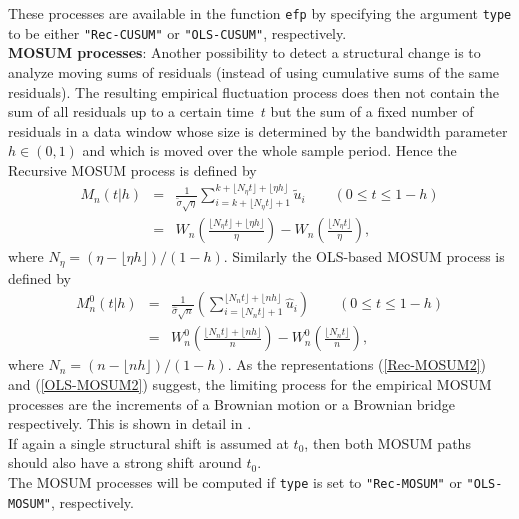 \documentclass[10pt,a4paper]{article}
\begin{document}
These processes are available in the function {\tt efp} by specifying the
argument {\tt type} to be either {\tt "Rec-CUSUM"} or {\tt "OLS-CUSUM"},
respectively.\\

{\bf MOSUM processes}:
Another possibility to detect a
structural change is to analyze moving sums of residuals (instead of using
cumulative sums of the same residuals).
The resulting empirical fluctuation process does then not contain the sum of all
residuals up to a certain time~$t$ but the sum of a fixed number of residuals in
a data window whose size is determined by the bandwidth parameter $h \in (0,1)$
and which is moved over the whole sample period. Hence the Recursive MOSUM
process is defined by
\begin{eqnarray} \label{Rec-MOSUM}
M_n(t | h) & = & \frac{1}{\tilde \sigma \sqrt{\eta}} \sum_{i =
k+\lfloor N_\eta t \rfloor +1}^{k+\lfloor N_\eta t \rfloor +\lfloor
\eta h \rfloor} \tilde u_i \qquad (0 \le t \le 1-h) \\
\label{Rec-MOSUM2}
& = &  W_n \left( \frac{ \lfloor N_\eta t \rfloor + \lfloor \eta
h\rfloor}{\eta} \right) - W_n \left( \frac{ \lfloor N_\eta t
\rfloor}{\eta} \right), \end{eqnarray}
where $N_\eta = (\eta - \lfloor \eta h \rfloor)/(1-h)$. Similarly the OLS-based
MOSUM process is defined by
\begin{eqnarray} \label{OLS-MOSUM}
M_n^0 (t | h) & = & \frac{1}{\hat \sigma \sqrt{n}} \left( \sum_{i =
\lfloor N_n t \rfloor +1}^{\lfloor N_n t \rfloor +\lfloor nh \rfloor} \hat u_i
\right) \qquad (0 \le t \le 1 - h) \\
\label{OLS-MOSUM2}
& = & W_n^0 \left( \frac{ \lfloor N_n t \rfloor + \lfloor n
h\rfloor}{n} \right) - W_n^0 \left( \frac{ \lfloor N_n t \rfloor}{n}
\right),
\end{eqnarray}
where $N_n = (n - \lfloor n h \rfloor)/(1-h)$. As the representations
(\ref{Rec-MOSUM2}) and (\ref{OLS-MOSUM2}) suggest, the limiting process
for the empirical MOSUM processes are the increments of a Brownian motion or a
Brownian bridge respectively. This is shown in detail in
 \cite{Z:Chu+Hornik+Kuan:1995}.\\

If again a single structural shift is assumed at $t_0$, then both MOSUM paths
should also have a strong shift around $t_0$.\\

The MOSUM processes will be computed if {\tt type} is set to {\tt "Rec-MOSUM"}
or {\tt "OLS-MOSUM"}, respectively.\\
\end{document}
